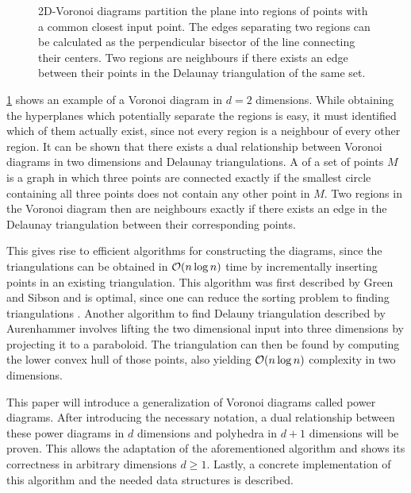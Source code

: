 \begin{figure}[Htb]
    \caption{2D-Voronoi diagrams partition the plane into regions of points with a common closest input point. The edges separating two regions can be calculated as the perpendicular bisector of the line connecting their centers. Two regions are neighbours if there exists an edge between their points in the Delaunay triangulation of the same set.}
    \label{fig:voronoi}
\end{figure}

\cref{fig:voronoi} shows an example of a Voronoi diagram in $d = 2$ dimensions.
While obtaining the hyperplanes which potentially separate the regions is easy, it must identified which of them actually exist, since not every region is a neighbour of every other region.
It can be shown \cite{aurenhammer1991voronoi} that there exists a dual relationship between Voronoi diagrams in two dimensions and Delaunay triangulations.
A  of a set of points $M$ is a graph in which three points are connected exactly if the smallest circle containing all three points does not contain any other point in $M$.
Two regions in the Voronoi diagram then are neighbours exactly if there exists an edge in the Delaunay triangulation between their corresponding points.

This gives rise to efficient algorithms for constructing the diagrams, since the triangulations can be obtained in $\mathcal{O}(n \log n)$ time by incrementally inserting points in an existing triangulation.
This algorithm was first described by Green and Sibson \cite{green1978computing} and is optimal, since one can reduce the sorting problem to finding triangulations \cite{aurenhammer1991voronoi}.
Another algorithm to find Delauny triangulation described by Aurenhammer involves lifting the two dimensional input into three dimensions by projecting it to a paraboloid.
The triangulation can then be found by computing the lower convex hull of those points, also yielding $\mathcal{O}(n \log n)$ complexity in two dimensions.

This paper will introduce a generalization of Voronoi diagrams called power diagrams.
After introducing the necessary notation, a dual relationship between these power diagrams in $d$ dimensions and polyhedra in $d+1$ dimensions will be proven.
This allows the adaptation of the aforementioned algorithm and shows its correctness in arbitrary dimensions $d \geq 1$.
Lastly, a concrete implementation of this algorithm and the needed data structures is described.


